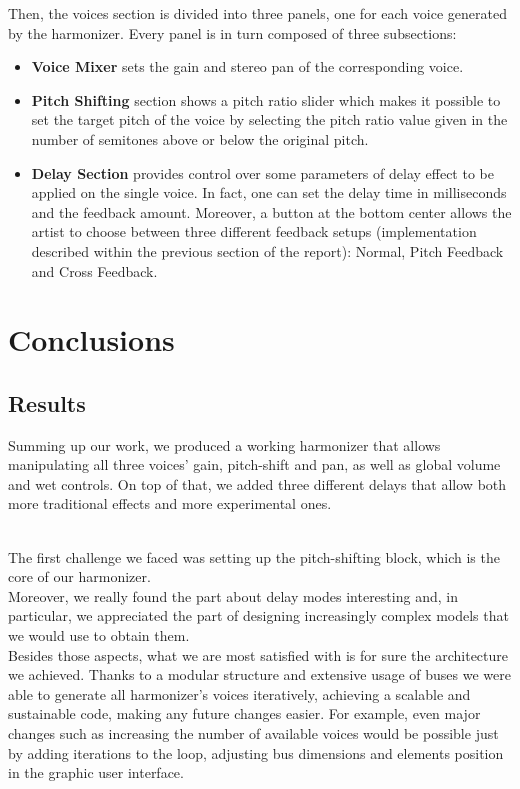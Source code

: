 \documentclass{article}
\begin{document}
Then, the voices section is divided into three panels, one for each voice generated by the harmonizer. Every panel is in turn composed of three subsections:
\begin{itemize}
  \item \textbf{Voice Mixer} sets the gain and stereo pan of the corresponding voice.
  \item \textbf{Pitch Shifting} section shows a pitch ratio slider which makes it possible to set the target pitch of the voice by selecting the pitch ratio value given in the number of semitones above or below the original pitch.
  \item \textbf{Delay Section} provides control over some parameters of delay effect to be applied on the single voice. In fact, one can set the delay time in milliseconds and the feedback amount. Moreover, a button at the bottom center allows the artist to choose between three different feedback setups (implementation described within the previous section of the report): Normal, Pitch Feedback and Cross Feedback.
  \vspace{10mm}
\end{itemize}

{
\section{Conclusions}
\subsection{Results}
Summing up our work, we produced a working harmonizer that allows manipulating all three voices’ gain, pitch-shift and pan, as well as global volume and wet controls. On top of that, we added three different delays that allow both more traditional effects and more experimental ones.}
\\The first challenge we faced was setting up the pitch-shifting block, which is the core of our harmonizer. 
\\Moreover, we really found the part about delay modes interesting and, in particular, we appreciated the part of designing increasingly complex models that we would use to obtain them.
\\Besides those aspects, what we are most satisfied with is for sure the architecture we achieved. Thanks to a modular structure and extensive usage of buses we were able to generate all harmonizer’s voices iteratively, achieving a scalable and sustainable code, making any future changes easier. For example, even major changes such as increasing the number of available voices would be possible just by adding iterations to the loop, adjusting bus dimensions and elements position in the graphic user interface.
\end{document}
